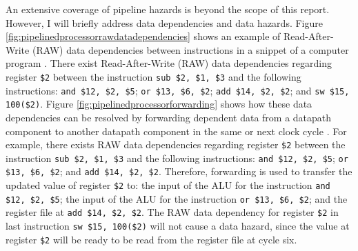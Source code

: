 An extensive coverage of pipeline hazards is beyond the scope of this report. However, I will briefly address data dependencies and data hazards. Figure \ref{fig:pipelinedprocessorrawdatadependencies} shows an example of Read-After-Write (RAW) data dependencies \cite{Hennessy2012,Shen2005a} between instructions in a snippet of a computer program \cite{Patterson2012}. There exist Read-After-Write (RAW) data dependencies \cite{Hennessy2012,Shen2005a} regarding register {\tt \$2} between the instruction {\tt sub \$2, \$1, \$3} and the following instructions: {\tt and \$12, \$2, \$5}; {\tt or \$13, \$6, \$2}; {\tt add \$14, \$2, \$2}; and {\tt sw \$15, 100(\$2)}. Figure \ref{fig:pipelinedprocessorforwarding} shows how these data dependencies can be resolved by forwarding dependent data from a datapath component to another datapath component in the same or next clock cycle \cite{Patterson2012}. For example, there exists RAW data dependencies \cite{Hennessy2012,Shen2005a} regarding register {\tt \$2} between the instruction {\tt sub \$2, \$1, \$3} and the following instructions: {\tt and \$12, \$2, \$5}; {\tt or \$13, \$6, \$2}; and {\tt add \$14, \$2, \$2}. Therefore, forwarding is used to transfer the updated value of register {\tt \$2} to: the input of the ALU for the instruction {\tt and \$12, \$2, \$5}; the input of the ALU for the instruction {\tt or \$13, \$6, \$2}; and the register file at {\tt add \$14, \$2, \$2}. The RAW data dependency for register {\tt \$2} in last instruction {\tt sw \$15, 100(\$2)} will not cause a data hazard, since the value at register {\tt \$2} will be ready to be read from the register file at cycle six. \\



